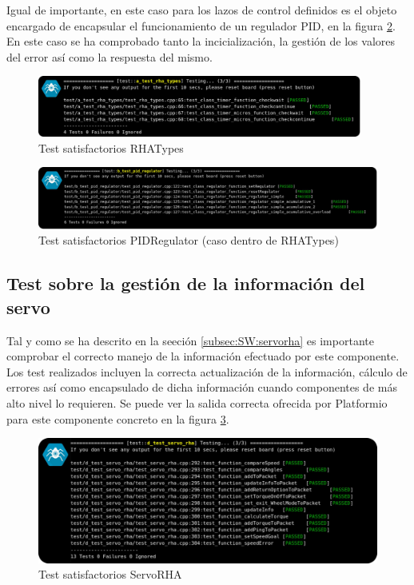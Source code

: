         Igual de importante, en este caso para los lazos de control definidos es el objeto encargado de encapsular el funcionamiento de un regulador PID, en la figura \ref{fig:SW:test:pid_regulator_ok}. En este caso se ha comprobado tanto la incicialización, la gestión de los valores del error así como la respuesta del mismo.
        \begin{figure}[H]
            \centering
            \includegraphics[width=0.95\textwidth]{figuras/Imagenes_SW/test/SWTest_2.jpg}
            \caption{Test satisfactorios RHATypes}
            \label{fig:SW:test:rha_types_ok}
        \end{figure}
        \begin{figure}[H]
            \centering
            \includegraphics[width=1\textwidth]{figuras/Imagenes_SW/test/SWTest_9.jpg}
            \caption{Test satisfactorios PIDRegulator (caso dentro de RHATypes)}
            \label{fig:SW:test:pid_regulator_ok}
        \end{figure}

    \subsection{Test sobre la gestión de la información del servo}
        Tal y como se ha descrito en la seeción \ref{subsec:SW:servorha} es importante comprobar el correcto manejo de la información efectuado por este componente. Los test realizados incluyen la correcta actualización de la información, cálculo de errores así como encapsulado de dicha información cuando componentes de más alto nivel lo requieren. Se puede ver la salida correcta ofrecida por Platformio para este componente concreto en la figura \ref{fig:SW:test:servo_rha_ok}.
        \begin{figure}[H]
            \centering
            \includegraphics[width=1\textwidth]{figuras/Imagenes_SW/test/SWTest_4.jpg}
            \caption{Test satisfactorios ServoRHA}
            \label{fig:SW:test:servo_rha_ok}
        \end{figure}

